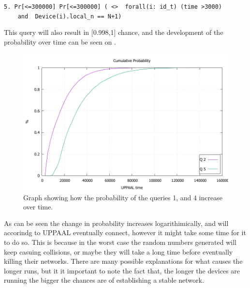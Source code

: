 \begin{lstlisting}[style=UPPAAL, title={This query asks after 3000 UPPAAL time units has passed, what then is the probability that a device \texttt{i} has a local value of \texttt{n} to be equal to the number of devices, which is \texttt{N} + 1, which means that all devices are in the same network.}]
5. Pr[<=300000] Pr[<=300000] ( <>  forall(i: id_t) (time >3000) 
	and  Device(i).local_n == N+1)
\end{lstlisting}

\noindent This query will also result in [0.998,1] chance, and the development of the probability over time can be seen on .


\begin{figure}
  \includegraphics[width=1\textwidth]{Figures/Graphs/ConnectTime.pdf} 
\caption{Graph showing how the probability of the queries 1, and 4 increase over time.}
\label{fig:ConnectQueryTime}
\end{figure}

As can be seen the change in probability increases logarithimically, and will accorindg to UPPAAL eventually connect, however it might take some time for it to do so.
This is because in the worst case the random numbers generated will keep casuing collisions, or maybe they will take a long time before eventually killing their networks.
There are many possible explanations for what causes the longer runs, but it it important to note the fact that, the longer the devices are running the bigger the chances are of establishing a stable network.


